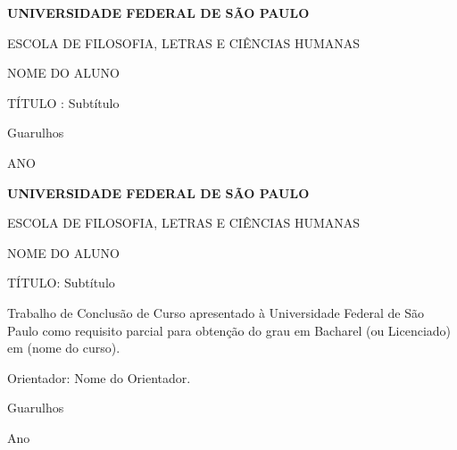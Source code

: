 \documentclass[a4paper,12pt]{scrbook}
\begin{document}
\renewcommand{\chapterpagestyle}{scrheadings}



\begin{titlepage}
\begin{center}
\large \bfseries UNIVERSIDADE FEDERAL DE SÃO PAULO

ESCOLA DE FILOSOFIA, LETRAS E CIÊNCIAS HUMANAS
\end{center}

\vspace{3cm}

\centering

\LARGE \bfseries \sffamily

NOME DO ALUNO
\vspace{5cm}


TÍTULO : Subtítulo

\vfill

\large Guarulhos \par
ANO

\end{titlepage}

\begin{titlepage}
\begin{center}
\large \bfseries UNIVERSIDADE FEDERAL DE SÃO PAULO

ESCOLA DE FILOSOFIA, LETRAS E CIÊNCIAS HUMANAS
\end{center}

\vspace{3cm}

\begin{center}




\LARGE \bfseries \sffamily 


NOME DO ALUNO
\vspace{3cm}

TÍTULO: Subtítulo
\end{center}

\bigskip


\begin{flushright}
\begin{minipage}{.5\textwidth}
\singlespacing
Trabalho de Conclusão de Curso apresentado à Universidade Federal de São Paulo como requisito parcial para obtenção do grau em Bacharel (ou Licenciado) em (nome do curso).\par 
Orientador: Nome do Orientador.
\end{minipage}
\end{flushright}

\vfill
\centering
Guarulhos \par 
Ano
\end{titlepage}
\end{document}
